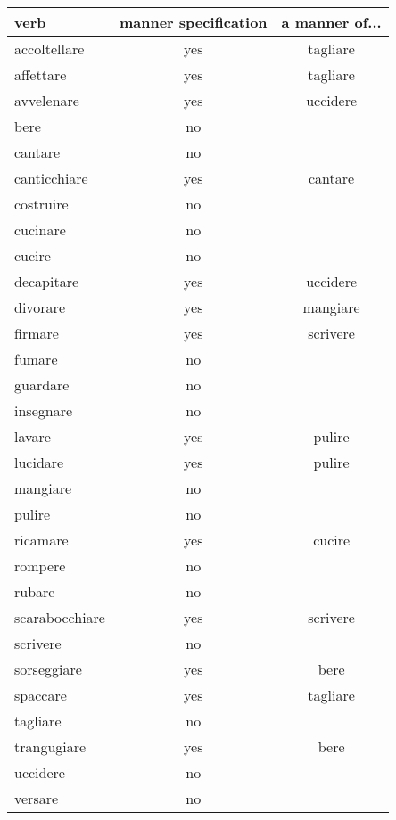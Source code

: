 \begin{longtable}{l|cc}
\textbf{verb}     & \textbf{manner specification}  & \textbf{a manner of...}   \\
\hline
\endhead
accoltellare   & yes       & tagliare   \\
affettare      & yes       & tagliare   \\
avvelenare     & yes       & uccidere   \\
bere           & no       &    \\
cantare        & no      &     \\
canticchiare   & yes      & cantare   \\
costruire      & no      &     \\
cucinare       & no      &     \\
cucire         & no      &     \\
decapitare     & yes      & uccidere   \\
divorare       & yes      & mangiare   \\
firmare        & yes      & scrivere   \\
fumare         & no      &     \\
guardare       & no      &     \\
insegnare      & no     &      \\
lavare         & yes    & pulire     \\
lucidare       & yes    & pulire     \\
mangiare       & no    &       \\
pulire         & no    &       \\
ricamare       & yes    & cucire     \\
rompere        & no    &       \\
rubare         & no    &       \\
scarabocchiare & yes    & scrivere     \\
scrivere       & no    &       \\
sorseggiare    & yes    & bere     \\
spaccare       & yes    & tagliare     \\
tagliare       & no    &       \\
trangugiare    & yes    & bere     \\
uccidere       & no    &       \\
versare        & no    &      
\end{longtable}
